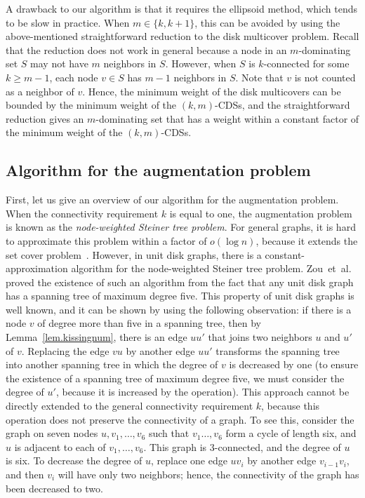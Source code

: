 \documentclass[11pt]{article}
\begin{document}
 A drawback to our algorithm is that it requires the ellipsoid method,
 which tends to be slow in practice.
 When $m \in \{k,k+1\}$,
 this can be avoided by using the above-mentioned straightforward reduction to the disk multicover problem.
 Recall that the reduction does not work in general
 because
 a node in an $m$-dominating set $S$ may not have $m$ neighbors in $S$.
 However, when $S$ is $k$-connected for some $k \geq m-1$,
 each node $v \in S$ has $m-1$ neighbors in $S$. Note that $v$ is not
 counted as a neighbor of $v$.
 Hence, the minimum weight of the disk multicovers can be bounded by the
 minimum weight of the $(k,m)$-CDSs,
 and the straightforward reduction gives an $m$-dominating set
 that has a weight within a constant factor of the minimum weight of
 the $(k,m)$-CDSs.


 \subsection{Algorithm for the augmentation problem}
 \label{ssec.augmentation}
 
First, let us give an overview of our algorithm for the augmentation
problem.
When the connectivity requirement $k$ is equal to one, 
the augmentation problem is known as the \emph{node-weighted Steiner
tree problem}.
For general graphs, it is hard to approximate this problem within a factor of $o(\log n)$,
because it extends the set cover problem~\cite{KleinR95}.
However, in unit disk graphs, there is a constant-approximation
algorithm for the node-weighted Steiner tree problem.
Zou~et~al.~\cite{ZouLGW09} proved the existence of such an algorithm from the 
fact that
any unit disk graph has a spanning tree of maximum degree five.
This property of unit disk graphs is well known, and it can be shown by
using the following observation: if there is a node $v$ of degree more than
five in a spanning tree, then by Lemma~\ref{lem.kissingnum},
there is an edge $uu'$ that joins two neighbors $u$ and $u'$ of $v$.
Replacing the edge $vu$ by another edge $uu'$ transforms the spanning tree into
another spanning tree in which the degree of $v$ is decreased by one
(to ensure the existence of a spanning tree of maximum degree five, we must consider the degree of $u'$, because it is increased by the operation).
This approach cannot be directly extended to the general connectivity
requirement $k$, because this operation does not preserve the connectivity
of a graph.
To see this, consider the graph on seven nodes $u,
v_1,\ldots,v_6$ such that
$v_1\ldots,v_6$ form a cycle of length six, and $u$ is adjacent to each of
$v_1,\ldots,v_6$.
This graph is 3-connected, and the degree of $u$ is six. To decrease the
degree of $u$, replace one edge $uv_i$ by another edge $v_{i-1}v_i$, and 
then $v_i$ will have only two neighbors; hence, the
connectivity of the graph has been decreased to two.
\end{document}
